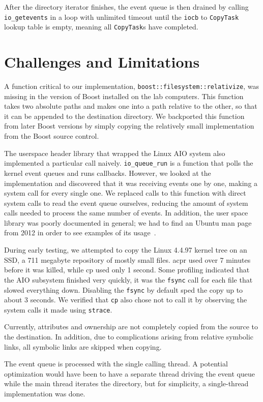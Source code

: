 \documentclass[11pt]{article}
\begin{document}
After the directory iterator finishes, the event queue is then drained by calling \texttt{io\_getevents} in a loop with unlimited timeout until the \texttt{iocb} to \texttt{CopyTask} lookup table is empty, meaning all \texttt{CopyTask}s have completed.

\section{Challenges and Limitations}
A function critical to our implementation,
\texttt{boost::filesystem::relativize}, was missing in the version of Boost
installed on the lab computers. This function takes two absolute paths and makes
one into a path relative to the other, so that it can be appended to the
destination directory. We backported this function from later Boost versions by
simply copying the relatively small implementation from the Boost source
control.

The userspace header library that wrapped the Linux AIO system also implemented
a particular call naively. \texttt{io\_queue\_run} is a function that polls the
kernel event queues and runs callbacks. However, we looked at the implementation
and discovered that it was receiving events one by one, making a system call for
every single one. We replaced calls to this function with direct system calls to
read the event queue ourselves, reducing the amount of system calls needed to process the same number of events. In addition, the user space library was poorly documented in general; we had to find an Ubuntu man page from 2012 in order to see examples of its usage~\cite{ubuntu}.

During early testing, we attempted to copy the Linux 4.4.97 kernel tree on an SSD, a 711 megabyte repository of mostly small files. acpr used over 7 minutes before it was killed, while cp used only 1 second. Some profiling indicated that the AIO subsystem finished very quickly, it was the \texttt{fsync} call for each file that slowed everything down. Disabling the \texttt{fsync} by default sped the copy up to about 3 seconds. We verified that \texttt{cp} also chose not to call it by observing the system calls it made using \texttt{strace}. 

Currently, attributes and ownership are not completely copied from the source to the destination. In addition, due to complications arising from relative symbolic links, all symbolic links are skipped when copying.

The event queue is processed with the single calling thread. A potential optimization would have been to have a separate thread driving the event queue while the main thread iterates the directory, but for simplicity, a single-thread implementation was done.
\end{document}
